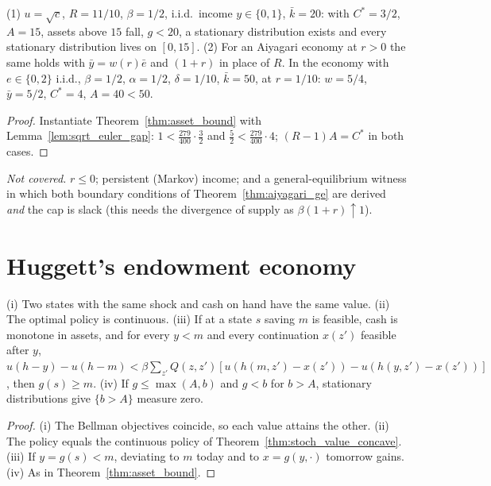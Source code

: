 \begin{theorem}
\label{thm:asset_bound_examples}
\leanok
{}
(1) $u=\sqrt c$, $R = 11/10$, $\beta=1/2$, i.i.d.\ income $y\in\{0,1\}$, $\bar k=20$: with $C^*=3/2$, $A = 15$, assets
above $15$ fall, $g<20$, a stationary distribution exists and every stationary distribution lives on $[0,15]$. (2) For an Aiyagari economy at $r>0$ the same
holds with $\bar y = w(r)\bar e$ and $(1+r)$ in place of $R$. In the economy with $e\in\{0,2\}$ i.i.d., $\beta=1/2$,
$\alpha=1/2$, $\delta=1/10$, $\bar k = 50$, at $r = 1/10$: $w = 5/4$, $\bar y = 5/2$, $C^* = 4$, $A = 40<50$.
\end{theorem}
\begin{proof}
\leanok
Instantiate Theorem~\ref{thm:asset_bound} with Lemma~\ref{lem:sqrt_euler_gap}: $1 < \tfrac{279}{400}\cdot\tfrac32$ and
$\tfrac52<\tfrac{279}{400}\cdot4$; $(R-1)A = C^*$ in both cases.
\end{proof}

\noindent\emph{Not covered.} $r\le0$; persistent (Markov) income; and a general-equilibrium witness in which both
boundary conditions of Theorem~\ref{thm:aiyagari_ge} are derived \emph{and} the cap is slack (this needs the
divergence of supply as $\beta(1+r)\uparrow1$).

\section{Huggett's endowment economy}
\label{sec:huggett}

\begin{lemma}
\label{lem:huggett_tools}
\leanok
{}
(i) Two states with the same shock and cash on hand have the same value. (ii) The optimal policy is continuous.
(iii) If at a state $s$ saving $m$ is feasible, cash is monotone in assets, and for every $y<m$ and every
continuation $x(z')$ feasible after $y$, $u(h-y)-u(h-m) < \beta\sum_{z'}Q(z,z')[u(h(m,z')-x(z')) - u(h(y,z')-x(z'))]$,
then $g(s)\ge m$. (iv) If $g\le\max(A,b)$ and $g<b$ for $b>A$, stationary distributions give $\{b>A\}$ measure zero.
\end{lemma}
\begin{proof}
\leanok
(i) The Bellman objectives coincide, so each value attains the other. (ii) The policy equals the continuous policy
of Theorem~\ref{thm:stoch_value_concave}. (iii) If $y = g(s) < m$, deviating to $m$ today and to $x = g(y,\cdot)$
tomorrow gains. (iv) As in Theorem~\ref{thm:asset_bound}.
\end{proof}

